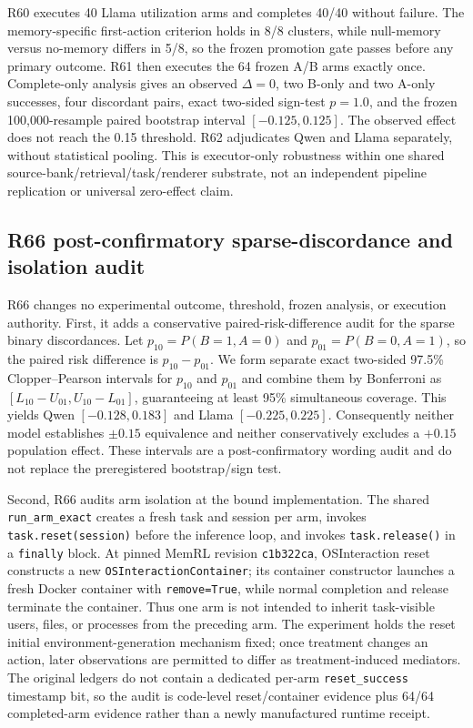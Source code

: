 R60 executes 40 Llama utilization arms and completes 40/40 without failure. The memory-specific first-action criterion holds in 8/8 clusters, while null-memory versus no-memory differs in 5/8, so the frozen promotion gate passes before any primary outcome. R61 then executes the 64 frozen A/B arms exactly once. Complete-only analysis gives an observed $\Delta=0$, two B-only and two A-only successes, four discordant pairs, exact two-sided sign-test $p=1.0$, and the frozen 100,000-resample paired bootstrap interval $[-0.125,0.125]$. The observed effect does not reach the 0.15 threshold. R62 adjudicates Qwen and Llama separately, without statistical pooling. This is executor-only robustness within one shared source-bank/retrieval/task/renderer substrate, not an independent pipeline replication or universal zero-effect claim.

\subsection{R66 post-confirmatory sparse-discordance and isolation audit}
R66 changes no experimental outcome, threshold, frozen analysis, or execution authority. First, it adds a conservative paired-risk-difference audit for the sparse binary discordances. Let $p_{10}=P(B=1,A=0)$ and $p_{01}=P(B=0,A=1)$, so the paired risk difference is $p_{10}-p_{01}$. We form separate exact two-sided 97.5\% Clopper--Pearson intervals for $p_{10}$ and $p_{01}$ and combine them by Bonferroni as $[L_{10}-U_{01},U_{10}-L_{01}]$, guaranteeing at least 95\% simultaneous coverage. This yields Qwen $[-0.128,0.183]$ and Llama $[-0.225,0.225]$. Consequently neither model establishes $\pm0.15$ equivalence and neither conservatively excludes a $+0.15$ population effect. These intervals are a post-confirmatory wording audit and do not replace the preregistered bootstrap/sign test.

Second, R66 audits arm isolation at the bound implementation. The shared \texttt{run\_arm\_exact} creates a fresh task and session per arm, invokes \texttt{task.reset(session)} before the inference loop, and invokes \texttt{task.release()} in a \texttt{finally} block. At pinned MemRL revision \texttt{c1b322ca}, OSInteraction reset constructs a new \texttt{OSInteractionContainer}; its container constructor launches a fresh Docker container with \texttt{remove=True}, while normal completion and release terminate the container. Thus one arm is not intended to inherit task-visible users, files, or processes from the preceding arm. The experiment holds the reset initial environment-generation mechanism fixed; once treatment changes an action, later observations are permitted to differ as treatment-induced mediators. The original ledgers do not contain a dedicated per-arm \texttt{reset\_success} timestamp bit, so the audit is code-level reset/container evidence plus 64/64 completed-arm evidence rather than a newly manufactured runtime receipt.

